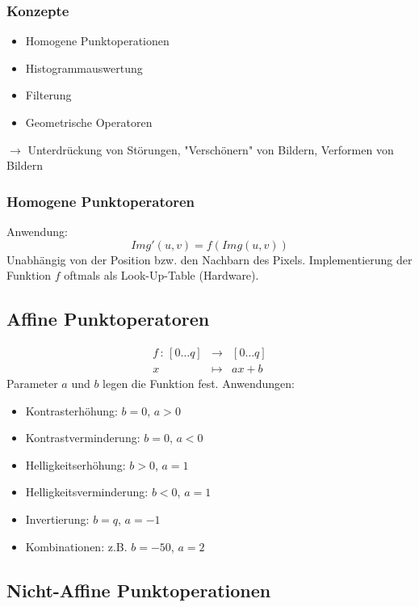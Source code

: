 \subsubsection*{Konzepte}

\begin{itemize}
\item Homogene Punktoperationen
\item Histogrammauswertung
\item Filterung
\item Geometrische Operatoren
\end{itemize}
$\to$ Unterdrückung von Störungen, "{}Verschönern"{} von Bildern, Verformen von Bildern

\subsubsection*{Homogene Punktoperatoren}

Anwendung: $$Img'(u,v) = f(Img(u,v))$$
Unabhängig von der Position bzw. den Nachbarn des Pixels. Implementierung der Funktion $f$ oftmals als Look-Up-Table (Hardware).

\subsection{Affine Punktoperatoren}

\begin{eqnarray*}
f \, : \, [0 \dots q] &\to& [0 \dots q] \\ x &\mapsto& ax+b
\end{eqnarray*}
Parameter $a$ und $b$ legen die Funktion fest. Anwendungen:
\begin{itemize}
\item Kontrasterhöhung: $b=0$, $a > 0$ 
\item Kontrastverminderung: $b=0$, $a < 0$
\item Helligkeitserhöhung: $b > 0$, $a = 1$ 
\item Helligkeitsverminderung: $b < 0$, $a = 1$
\item Invertierung: $b = q$, $a = -1$
\item Kombinationen: z.B. $b=-50$, $a=2$
\end{itemize}

\subsection{Nicht-Affine Punktoperationen}

